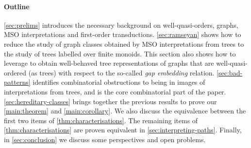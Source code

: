 \paragraph*{Outline}
\cref{sec:prelims} introduces the necessary background on well-quasi-orders,
graphs, MSO interpretations and first-order transductions.
\cref{sec:ramseyan} shows how to reduce the study of graph classes obtained by
MSO interpretations from trees to the study of trees labelled over finite monoids. This section also shows how to leverage 
 to obtain well-behaved tree representations of graphs
that are well-quasi-ordered (as trees) with respect to the so-called \emph{gap embedding} relation.
\cref{sec:bad-patterns} identifies combinatorial obstructions to being 
 in images of interpretations from trees, and is the core combinatorial part of the paper.
\cref{sec:hereditary-classes} brings together the previous results to prove
our \cref{main:theorem} and \cref{main:corollary}. We also 
discuss the equivalence between the first two items of \cref{thm:characterisations}.
The remaining items of \cref{thm:characterisations} 
are proven equivalent in \cref{sec:interpreting-paths}.
Finally, in 
\cref{sec:conclusion} we discuss some perspectives and open problems.
